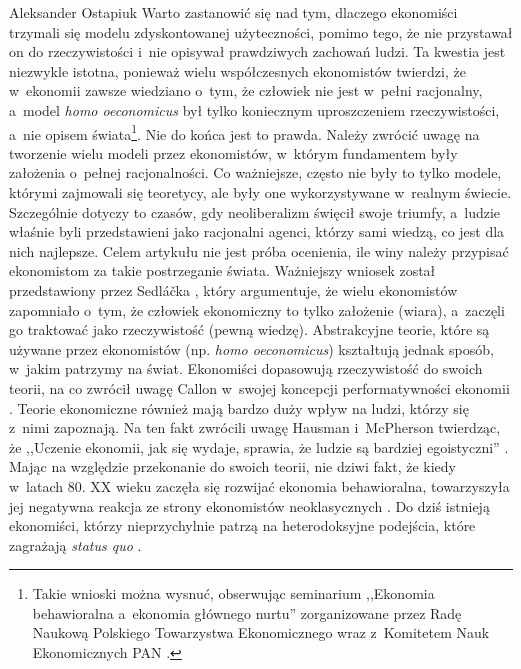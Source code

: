 \begin{artplenv}{Aleksander Ostapiuk}
Warto zastanowić się nad tym, dlaczego ekonomiści trzymali się modelu zdyskontowanej użyteczności, pomimo tego, że nie
przystawał on do rzeczywistości i~nie opisywał prawdziwych zachowań ludzi. Ta kwestia jest niezwykle istotna, ponieważ
wielu współczesnych ekonomistów twierdzi, że w~ekonomii zawsze wiedziano o~tym, że człowiek nie jest w~pełni
racjonalny, a~model \textit{homo oeconomicus} był tylko koniecznym uproszczeniem rzeczywistości, a~nie opisem
świata\footnote{Takie wnioski można wysnuć, obserwując seminarium ,,Ekonomia behawioralna a~ekonomia głównego nurtu''
zorganizowane przez Radę Naukową Polskiego Towarzystwa Ekonomicznego wraz z~Komitetem Nauk Ekonomicznych PAN
\parencite[zob.][]{noauthor_stenogram_2018}.
}. Nie do końca jest to prawda. Należy zwrócić uwagę na tworzenie wielu modeli przez
ekonomistów, w~którym fundamentem były założenia o~pełnej racjonalności. Co ważniejsze, często nie były to tylko modele, którymi
zajmowali się teoretycy, ale były one wykorzystywane w~realnym świecie. Szczególnie dotyczy to czasów, gdy
neoliberalizm święcił swoje triumfy, a~ludzie właśnie byli przedstawieni jako racjonalni agenci, którzy sami wiedzą, co
jest dla nich najlepsze. Celem artykułu nie jest próba ocenienia, ile winy należy przypisać ekonomistom za takie
postrzeganie świata. Ważniejszy wniosek został przedstawiony przez Sedláčka
\parencite*{sedlacek_ekonomia_2012_ost},
który
argumentuje, że wielu ekonomistów zapomniało o~tym, że człowiek ekonomiczny to tylko założenie (wiara), a~zaczęli go
traktować jako rzeczywistość (pewną wiedzę). Abstrakcyjne teorie, które są używane przez ekonomistów (np. \textit{homo
oeconomicus}) kształtują jednak sposób, w~jakim patrzymy na świat. Ekonomiści dopasowują rzeczywistość do swoich teorii,
na co zwrócił uwagę Callon w~swojej koncepcji performatywności ekonomii
\parencites{callon_what_2006}[więcej zob.][]{boldyrev_enacting_2016}.
Teorie ekonomiczne również mają bardzo duży wpływ na ludzi, którzy się z~nimi
zapoznają. Na ten fakt zwrócili uwagę Hausman i~McPherson twierdząc, że ,,Uczenie ekonomii, jak się wydaje, sprawia, że
ludzie są bardziej egoistyczni''
\parencite[s.~674]{hausman_taking_1993}.
Mając na względzie
przekonanie do swoich teorii, nie dziwi fakt, że kiedy w~latach 80. XX wieku zaczęła się rozwijać ekonomia
behawioralna, towarzyszyła jej negatywna reakcja ze strony ekonomistów neoklasycznych
\parencite[zob.][]{thaler_misbehaving:_2015}.
Do dziś istnieją ekonomiści, którzy nieprzychylnie patrzą na heterodoksyjne podejścia, które zagrażają
\textit{status quo}
\parencite[zob.][]{fourcade_superiority_2015,colander_how_2018}.


\end{artplenv}
